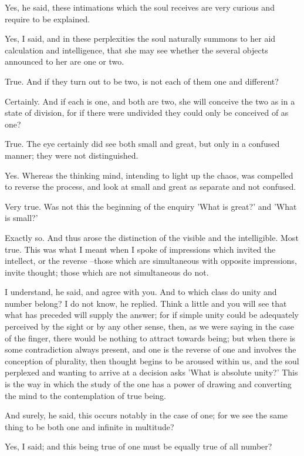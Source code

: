 Yes, he said, these intimations which the soul receives are very curious and require to be explained.

Yes, I said, and in these perplexities the soul naturally summons to her aid calculation and intelligence, that she may see whether the several objects announced to her are one or two.

True.
And if they turn out to be two, is not each of them one and different?

Certainly.
And if each is one, and both are two, she will conceive the two as in a state of division, for if there were undivided they could only be conceived of as one?

True.
The eye certainly did see both small and great, but only in a confused manner; they were not distinguished.

Yes.
Whereas the thinking mind, intending to light up the chaos, was compelled to reverse the process, and look at small and great as separate and not confused.

Very true.
Was not this the beginning of the enquiry 'What is great?' and 'What is small?'

Exactly so.
And thus arose the distinction of the visible and the intelligible.
Most true.
This was what I meant when I spoke of impressions which invited the intellect, or the reverse --those which are simultaneous with opposite impressions, invite thought; those which are not simultaneous do not.

I understand, he said, and agree with you.
And to which class do unity and number belong?
I do not know, he replied.
Think a little and you will see that what has preceded will supply the answer; for if simple unity could be adequately perceived by the sight or by any other sense, then, as we were saying in the case of the finger, there would be nothing to attract towards being; but when there is some contradiction always present, and one is the reverse of one and involves the conception of plurality, then thought begins to be aroused within us, and the soul perplexed and wanting to arrive at a decision asks 'What is absolute unity?' This is the way in which the study of the one has a power of drawing and converting the mind to the contemplation of true being.

And surely, he said, this occurs notably in the case of one; for we see the same thing to be both one and infinite in multitude?

Yes, I said; and this being true of one must be equally true of all number?

